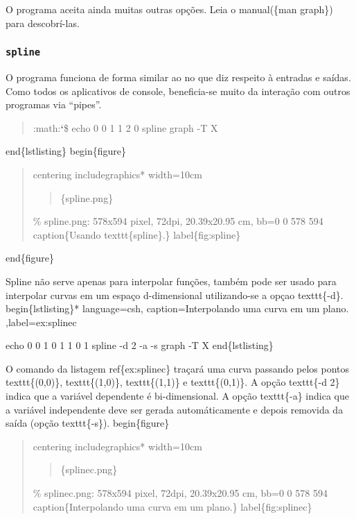 \documentclass[a4paper,10pt,portuguese]{sphinxmanual}
\begin{document}
O programa  aceita ainda muitas outras opções. Leia o
manual(\{man graph\}) para descobrí-las.


\subsubsection{\texttt{spline}}
\label{bash:spline}
O programa funciona de forma similar ao  no que diz
respeito à entradas e saídas. Como todos os aplicativos de console,
beneficia-se muito da interação com outros programas via ``pipes''.
\begin{quote}

:math:{\color{red}\bfseries{}{}`}\$ echo 0 0 1 1 2 0 \textbar{} spline \textbar{} graph -T X
\end{quote}

end\{lstlisting\}
begin\{figure\}
\begin{quote}

centering
includegraphics* width=10cm
\begin{quote}

\{spline.png\}
\end{quote}

\% spline.png: 578x594 pixel, 72dpi, 20.39x20.95 cm, bb=0 0 578 594
caption\{Usando texttt\{spline\}.\}
label\{fig:spline\}
\end{quote}

end\{figure\}

Spline não serve apenas para interpolar funções, também pode ser usado para interpolar curvas em um espaço d-dimensional utilizando-se a opçao texttt\{-d\}.
begin\{lstlisting\}* language=csh, caption=Interpolando uma curva em um plano. ,label=ex:splinec

echo 0 0 1 0 1 1 0 1 \textbar{} spline -d 2 -a -s \textbar{} graph -T X
end\{lstlisting\}

O comando da listagem ref\{ex:splinec\} traçará uma curva passando pelos pontos texttt\{(0,0)\}, texttt\{(1,0)\}, texttt\{(1,1)\} e texttt\{(0,1)\}. A opção texttt\{-d 2\} indica que a variável dependente é bi-dimensional. A opção texttt\{-a\} indica que a variável independente deve ser gerada automáticamente e depois removida da saída (opção texttt\{-s\}).
begin\{figure\}
\begin{quote}

centering
includegraphics* width=10cm
\begin{quote}

\{splinec.png\}
\end{quote}

\% splinec.png: 578x594 pixel, 72dpi, 20.39x20.95 cm, bb=0 0 578 594
caption\{Interpolando uma curva em um plano.\}
label\{fig:splinec\}
\end{quote}
\end{document}
